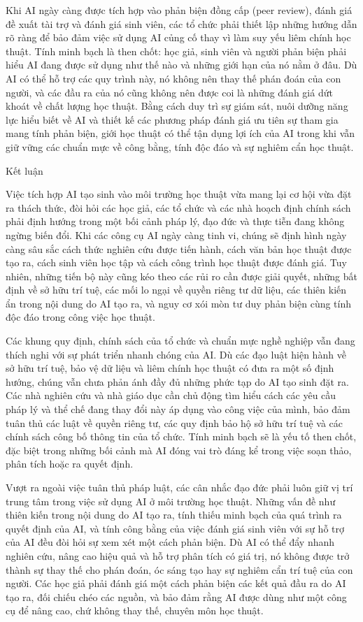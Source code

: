 Khi AI ngày càng được tích hợp vào phản biện đồng cấp (peer review), đánh giá đề xuất tài trợ và đánh giá sinh viên, các tổ chức phải thiết lập những hướng dẫn rõ ràng để bảo đảm việc sử dụng AI củng cố thay vì làm suy yếu liêm chính học thuật. Tính minh bạch là then chốt: học giả, sinh viên và người phản biện phải hiểu AI đang được sử dụng như thế nào và những giới hạn của nó nằm ở đâu. Dù AI có thể hỗ trợ các quy trình này, nó không nên thay thế phán đoán của con người, và các đầu ra của nó cũng không nên được coi là những đánh giá dứt khoát về chất lượng học thuật. Bằng cách duy trì sự giám sát, nuôi dưỡng năng lực hiểu biết về AI và thiết kế các phương pháp đánh giá ưu tiên sự tham gia mang tính phản biện, giới học thuật có thể tận dụng lợi ích của AI trong khi vẫn giữ vững các chuẩn mực về công bằng, tính độc đáo và sự nghiêm cẩn học thuật.

Kết luận

Việc tích hợp AI tạo sinh vào môi trường học thuật vừa mang lại cơ hội vừa đặt ra thách thức, đòi hỏi các học giả, các tổ chức và các nhà hoạch định chính sách phải định hướng trong một bối cảnh pháp lý, đạo đức và thực tiễn đang không ngừng biến đổi. Khi các công cụ AI ngày càng tinh vi, chúng sẽ định hình ngày càng sâu sắc cách thức nghiên cứu được tiến hành, cách văn bản học thuật được tạo ra, cách sinh viên học tập và cách công trình học thuật được đánh giá. Tuy nhiên, những tiến bộ này cũng kéo theo các rủi ro cần được giải quyết, những bất định về sở hữu trí tuệ, các mối lo ngại về quyền riêng tư dữ liệu, các thiên kiến ẩn trong nội dung do AI tạo ra, và nguy cơ xói mòn tư duy phản biện cùng tính độc đáo trong công việc học thuật.

Các khung quy định, chính sách của tổ chức và chuẩn mực nghề nghiệp vẫn đang thích nghi với sự phát triển nhanh chóng của AI. Dù các đạo luật hiện hành về sở hữu trí tuệ, bảo vệ dữ liệu và liêm chính học thuật có đưa ra một số định hướng, chúng vẫn chưa phản ánh đầy đủ những phức tạp do AI tạo sinh đặt ra. Các nhà nghiên cứu và nhà giáo dục cần chủ động tìm hiểu cách các yêu cầu pháp lý và thể chế đang thay đổi này áp dụng vào công việc của mình, bảo đảm tuân thủ các luật về quyền riêng tư, các quy định bảo hộ sở hữu trí tuệ và các chính sách công bố thông tin của tổ chức. Tính minh bạch sẽ là yếu tố then chốt, đặc biệt trong những bối cảnh mà AI đóng vai trò đáng kể trong việc soạn thảo, phân tích hoặc ra quyết định.

Vượt ra ngoài việc tuân thủ pháp luật, các cân nhắc đạo đức phải luôn giữ vị trí trung tâm trong việc sử dụng AI ở môi trường học thuật. Những vấn đề như thiên kiến trong nội dung do AI tạo ra, tính thiếu minh bạch của quá trình ra quyết định của AI, và tính công bằng của việc đánh giá sinh viên với sự hỗ trợ của AI đều đòi hỏi sự xem xét một cách phản biện. Dù AI có thể đẩy nhanh nghiên cứu, nâng cao hiệu quả và hỗ trợ phân tích có giá trị, nó không được trở thành sự thay thế cho phán đoán, óc sáng tạo hay sự nghiêm cẩn trí tuệ của con người. Các học giả phải đánh giá một cách phản biện các kết quả đầu ra do AI tạo ra, đối chiếu chéo các nguồn, và bảo đảm rằng AI được dùng như một công cụ để nâng cao, chứ không thay thế, chuyên môn học thuật.

